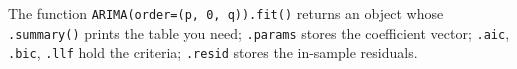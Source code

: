 \documentclass[a4paper,11pt]{article}
\begin{document}
\bigskip
\begin{warning}
The function \texttt{ARIMA(order=(p, 0, q)).fit()} returns an
object whose \texttt{.summary()} prints the table you need;
\texttt{.params} stores the coefficient vector;
\texttt{.aic}, \texttt{.bic}, \texttt{.llf} hold the criteria;
\texttt{.resid} stores the in-sample residuals.
\end{warning}
\end{document}
